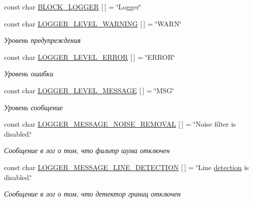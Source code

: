 \begin{DoxyCompactItemize}
const char \mbox{\hyperlink{namespaceyenot_a73be0cdcde2af378cd4043f56d4776e2}{B\+L\+O\+C\+K\+\_\+\+L\+O\+G\+G\+ER}} \mbox{[}$\,$\mbox{]} = \char`\"{}Logger\char`\"{}
\item 
const char \mbox{\hyperlink{namespaceyenot_a1133c576c0c3eebe5aa6c43529a56f21}{L\+O\+G\+G\+E\+R\+\_\+\+L\+E\+V\+E\+L\+\_\+\+W\+A\+R\+N\+I\+NG}} \mbox{[}$\,$\mbox{]} = \char`\"{}W\+A\+RN\char`\"{}
\begin{DoxyCompactList}\small\item\em Уровень предупреждения \end{DoxyCompactList}\item 
const char \mbox{\hyperlink{namespaceyenot_a08c0d88b074bcba3b7d79d019211a1ac}{L\+O\+G\+G\+E\+R\+\_\+\+L\+E\+V\+E\+L\+\_\+\+E\+R\+R\+OR}} \mbox{[}$\,$\mbox{]} = \char`\"{}E\+R\+R\+OR\char`\"{}
\begin{DoxyCompactList}\small\item\em Уровень ошибки \end{DoxyCompactList}\item 
const char \mbox{\hyperlink{namespaceyenot_a75d435531623705520a8bd478ae6e3ed}{L\+O\+G\+G\+E\+R\+\_\+\+L\+E\+V\+E\+L\+\_\+\+M\+E\+S\+S\+A\+GE}} \mbox{[}$\,$\mbox{]} = \char`\"{}M\+SG\char`\"{}
\begin{DoxyCompactList}\small\item\em Уровень сообщение \end{DoxyCompactList}\item 
const char \mbox{\hyperlink{namespaceyenot_ae3c6bd195ef1c9bdcbd48e5b44e17aaf}{L\+O\+G\+G\+E\+R\+\_\+\+M\+E\+S\+S\+A\+G\+E\+\_\+\+N\+O\+I\+S\+E\+\_\+\+R\+E\+M\+O\+V\+AL}} \mbox{[}$\,$\mbox{]} = \char`\"{}Noise filter is disabled.\char`\"{}
\begin{DoxyCompactList}\small\item\em Сообщение в лог о том, что фильтр шума отключен \end{DoxyCompactList}\item 
const char \mbox{\hyperlink{namespaceyenot_a3cc24a045a30435ab78be6014ff26a16}{L\+O\+G\+G\+E\+R\+\_\+\+M\+E\+S\+S\+A\+G\+E\+\_\+\+L\+I\+N\+E\+\_\+\+D\+E\+T\+E\+C\+T\+I\+ON}} \mbox{[}$\,$\mbox{]} = \char`\"{}Line \mbox{\hyperlink{group__coreh_ga0ef39a5ada0921b3abf8906957746b86}{detection}} is disabled.\char`\"{}
\begin{DoxyCompactList}\small\item\em Сообщение в лог о том, что детектор границ отключен \end{DoxyCompactList}\item 

\end{DoxyCompactItemize}
